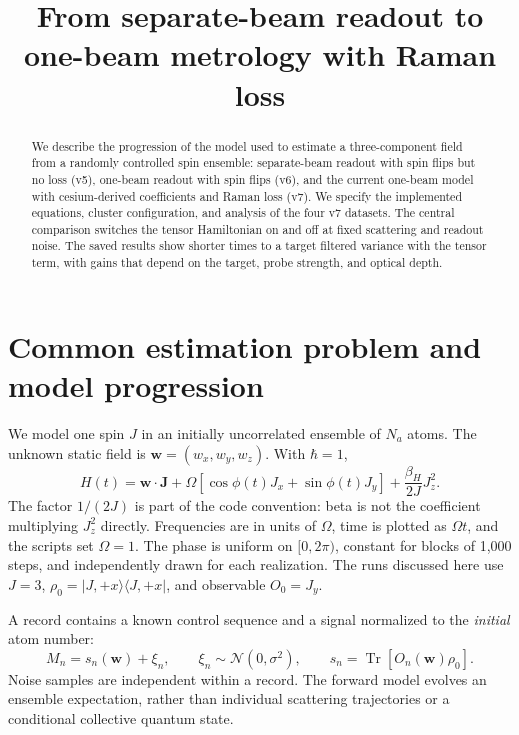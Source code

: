 \documentclass[11pt]{article}
\title{From separate-beam readout to one-beam metrology with Raman loss}
\author{}
\date{}
\newcommand{\Tr}{\operatorname{Tr}}
\newcommand{\code}[1]{{\small\ttfamily\def\_{\textunderscore\allowbreak}#1}}
\begin{document}
\maketitle

\begin{abstract}
We describe the progression of the model used to estimate a three-component field
from a randomly controlled spin ensemble: separate-beam readout with spin flips
but no loss (v5), one-beam readout with spin flips (v6), and the current one-beam
model with cesium-derived coefficients and Raman loss (v7). We specify the
implemented equations, cluster configuration, and analysis of the four v7 datasets.
The central comparison switches the tensor Hamiltonian on and off at fixed
scattering and readout noise. The saved results show shorter times to a target
filtered variance with the tensor term, with gains that depend on the target,
probe strength, and optical depth.
\end{abstract}

\section{Common estimation problem and model progression}

We model one spin $J$ in an initially uncorrelated ensemble of $N_a$ atoms. The
unknown static field is $\bm w=(w_x,w_y,w_z)$. With $\hbar=1$,
\begin{equation}
 H(t)=\bm w\cdot\bm J+
 \Omega[\cos\phi(t)J_x+\sin\phi(t)J_y]
 +\frac{\beta_H}{2J}J_z^2 .
 \label{eq:H}
\end{equation}
The factor $1/(2J)$ is part of the code convention: \code{beta} is not the
coefficient multiplying $J_z^2$ directly. Frequencies are in units of $\Omega$,
time is plotted as $\Omega t$, and the scripts set $\Omega=1$. The phase is
uniform on $[0,2\pi)$, constant for blocks of 1,000 steps, and independently
drawn for each realization. The runs discussed here use $J=3$,
$\rho_0=|J,+x\rangle\langle J,+x|$, and observable $O_0=J_y$.

A record contains a known control sequence and a signal normalized to the
\emph{initial} atom number:
\begin{equation}
 M_n=s_n(\bm w)+\xi_n,\qquad
 \xi_n\sim\mathcal N(0,\sigma^2),\qquad
 s_n=\Tr[O_n(\bm w)\rho_0].
 \label{eq:measurement}
\end{equation}
Noise samples are independent within a record. The forward model evolves an
ensemble expectation, rather than individual scattering trajectories or a
conditional collective quantum state.
\end{document}
